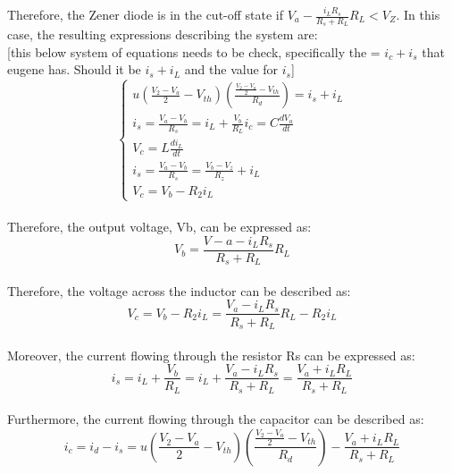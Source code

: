 Therefore, the Zener diode is in the cut-off state if $V_a - \frac{i_L R_s}{R_s+R_L} R_L < V_Z$. In this case, the resulting expressions describing the system are:\\


[this below system of equations needs to be check, specifically the = $i_c+i_s$ that eugene has. Should it be $i_s+i_L$ and the value for $i_s $]
\begin{equation}
    \begin{cases}
        u(\frac{V_2-V_a}{2}-V_{th})(\frac{\frac{V_2-V_a}{2}-V_{th}}{R_d})=i_s+i_L\\
        i_s=\frac{V_a-V_b}{R_s}=i_L+\frac{V_b}{R_L}
        i_c=C\frac{dV_a}{dt}\\
        V_c=L\frac{di_L}{dt}\\
        i_s=\frac{V_a-V_b}{R_s}=\frac{V_b-V_z}{R_z}+i_L\\
        V_c=V_b-R_2i_L
    \end{cases}
\end{equation}\\

Therefore, the output voltage, Vb, can be expressed as:\\

\begin{equation}
    V_b=\frac{V-a-i_LR_s}{R_s+R_L}R_L
\end{equation}\\

Therefore, the voltage across the inductor can be described as:\\

\begin{equation}
    V_c=V_b-R_2i_L=\frac{V_a-i_LR_s}{R_s+R_L}R_L-R_2i_L
\end{equation}\\

Moreover, the current flowing through the resistor Rs can be expressed as:\\

\begin{equation}
    i_s=i_L+\frac{V_b}{R_L}=i_L+\frac{V_a-i_LR_s}{R_s+R_L}=\frac{V_a+i_LR_L}{R_s+R_L}
\end{equation}\\

Furthermore, the current flowing through the capacitor can be described as:\\

\begin{equation}
    i_c=i_d-i_s=u(\frac{V_2-V_a}{2}-V_{th})(\frac{\frac{V_2-V_a}{2}-V_{th}}{R_d})-\frac{V_a+i_LR_L}{R_s+R_L}
\end{equation}\\

